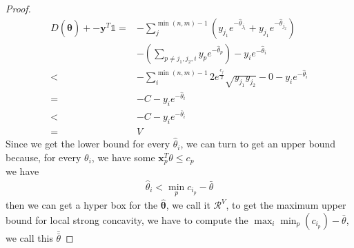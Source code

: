 \documentclass[11pt]{article}
\newcommand{\one}{\mathds{1}}
\renewcommand{\vec}[1]{\bm{#1}}
\begin{document}
\begin{proof}
\begin{equation}
\begin{split}
D(\hat{\vec \theta}) + -\vec y^{T} \one =& - \sum_{j}^{\min(n,m)-1}(y_{j_1} e^{ - \hat {\theta}_{j_1}} + y_{j_1} e^{ - \hat {\theta}_{j_2}}) \\
&- (\sum_{p\neq j_1, j_2, i}y_p e^{ - \hat {\theta}_p}) - y_i e^{ - \hat {\theta}_i} \\
<& - \sum_{i}^{\min(n,m)-1}2e^{\frac{c_j}{2}}\sqrt{y_{j_1}y_{j_2}} - 0- y_i e^{ - \hat {\theta}_i} \\
=& - C - y_i e^{ - \hat {\theta}_i} \\
<& - C - y_i e^{ - \bar {\theta}_i} \\
=& V
\end{split}
\end{equation}
Since we get the lower bound for every $\hat{\theta}_i$, we can turn to get an upper bound because, for every $\theta_i$, we have some $\vec x_p^T \theta \leq c_p$\\
we have
\begin{equation}
\begin{split}
\hat{\theta}_{i} <\min_p c_{i_p} - \bar{\theta}
\end{split}
\end{equation}
then we can get a hyper box for the $\hat{\vec\theta}$, we call it $\mathcal{R}^{V}$, to get the maximum upper bound for local strong concavity, we have to compute the $\max_{i}\min_p(c_{i_p}) - \bar{\theta}$, we call this $\bar{\bar{\theta}}$
\fi
\end{proof}
\end{document}
